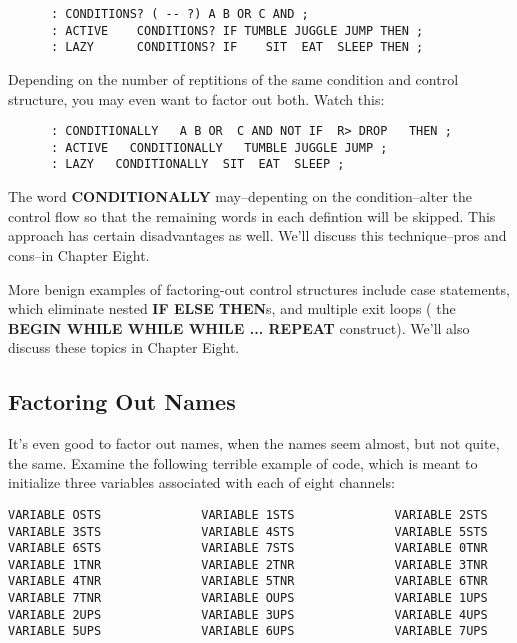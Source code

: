 \begin{verbatim}
      : CONDITIONS? ( -- ?) A B OR C AND ;
      : ACTIVE    CONDITIONS? IF TUMBLE JUGGLE JUMP THEN ;
      : LAZY      CONDITIONS? IF    SIT  EAT  SLEEP THEN ;
\end{verbatim}

\noindent 
Depending on the number of reptitions of the same condition and control structure, you may even want to factor out both. Watch this:

\begin{verbatim}
      : CONDITIONALLY   A B OR  C AND NOT IF  R> DROP   THEN ;
      : ACTIVE   CONDITIONALLY   TUMBLE JUGGLE JUMP ;
      : LAZY   CONDITIONALLY  SIT  EAT  SLEEP ;
\end{verbatim}

\noindent 
The word \textbf{CONDITIONALLY} may--depenting on the condition--alter the control flow so that the remaining words in each defintion will be skipped. This approach has certain disadvantages as well. We'll discuss this technique--pros and cons--in Chapter Eight.

More benign examples of factoring-out control structures include case statements, which eliminate nested \textbf{IF ELSE THEN}s, and multiple exit loops ( the \textbf{BEGIN WHILE WHILE WHILE ... REPEAT} construct). We'll also discuss these topics in Chapter Eight.

\subsection{{Factoring Out Names}}

It's even good to factor out names, when the names seem almost, but not quite, the same. Examine the following terrible example of code, which is meant to initialize three variables associated with each of eight channels:

\begin{verbatim} 
VARIABLE OSTS              VARIABLE 1STS              VARIABLE 2STS 
VARIABLE 3STS              VARIABLE 4STS              VARIABLE 5STS
VARIABLE 6STS              VARIABLE 7STS              VARIABLE 0TNR
VARIABLE 1TNR              VARIABLE 2TNR              VARIABLE 3TNR
VARIABLE 4TNR              VARIABLE 5TNR              VARIABLE 6TNR
VARIABLE 7TNR              VARIABLE OUPS              VARIABLE 1UPS
VARIABLE 2UPS              VARIABLE 3UPS              VARIABLE 4UPS
VARIABLE 5UPS              VARIABLE 6UPS              VARIABLE 7UPS
\end{verbatim}

